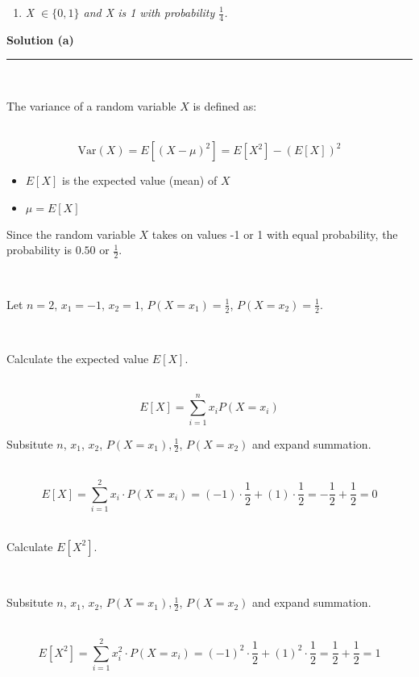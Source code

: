 \documentclass{article}
\begin{document}
\begin{enumerate}[label=(c)]
  \item \textit{X $\in \{0,1\}$ and X is 1 with probability $\frac{1}{4}$.}
\end{enumerate}

\textbf{Solution (a)}

\noindent\rule{\textwidth}{0.4pt}\\

\parbox{\textwidth}{The variance of a random variable $X$ is defined as:}\\

$$\text{Var}(X) = E[(X - \mu)^2] = E[X^2] - (E[X])^2$$

\begin{itemize}
    \item $E[X]$ is the expected value (mean) of $X$
    \item $\mu = E[X]$
\end{itemize}

\parbox{\textwidth}{Since the random variable $X$ takes on values -1 or 1 with equal probability, the probability is $0.50$ or $\frac{1}{2}$.}\\

\parbox{\textwidth}{Let $n = 2$, $x_1 = -1$, $x_2 = 1$, $P(X = x_1) = \frac{1}{2}$, $P(X = x_2) = \frac{1}{2}$.}\\

\parbox{\textwidth}{Calculate the expected value $E[X]$.}\\

$$E[X] = \sum^{n}_{i=1} x_i P(X = x_i)$$

\parbox{\textwidth}{Subsitute $n$, $x_1$, $x_2$, $P(X = x_1), \frac{1}{2}$, $P(X = x_2)$ and expand summation.}\\

$$E[X] = \sum^2_{i=1} x_i \cdot P(X = x_i) = (-1) \cdot \frac{1}{2} + (1) \cdot \frac{1}{2} = -\frac{1}{2} + \frac{1}{2} = 0$$\\

\parbox{\textwidth}{Calculate $E[X^2]$.}\\

\parbox{\textwidth}{Subsitute $n$, $x_1$, $x_2$, $P(X = x_1), \frac{1}{2}$, $P(X = x_2)$ and expand summation.}\\

$$E[X^2] = \sum^2_{i=1} x_i^2 \cdot P(X = x_i) = (-1)^2 \cdot \frac{1}{2} + (1)^2 \cdot \frac{1}{2} = \frac{1}{2} + \frac{1}{2} = 1$$\\
\end{document}

